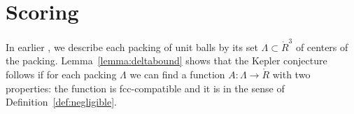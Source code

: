 %
%
%







\section{Scoring}

\label{sec:scoring}

In earlier \chaps, we describe each packing of unit balls by its set
$\Lambda\subset \ring{R}^3$ of centers of the packing.  
Lemma~\ref{lemma:deltabound} shows that the
Kepler conjecture follows if for each %
packing $\Lambda$ we
can find a function $A:\Lambda\to\ring{R}$ with two properties: the
function is fcc-compatible and it is 
in the sense of
Definition~\ref{def:negligible}.

